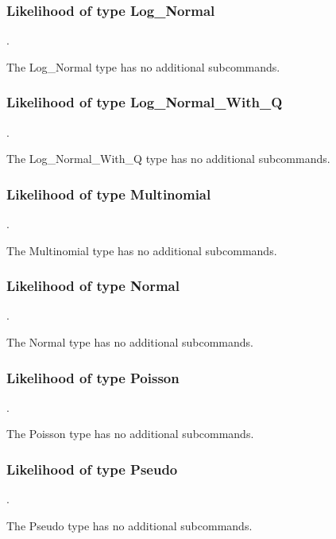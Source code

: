 \subsubsection{Likelihood of type Log\_Normal}
.
\label{syntax:Likelihood-LogNormal}

The Log\_Normal type has no additional subcommands.
\subsubsection{Likelihood of type Log\_Normal\_With\_Q}
.
\label{syntax:Likelihood-LogNormalWithQ}

The Log\_Normal\_With\_Q type has no additional subcommands.
\subsubsection{Likelihood of type Multinomial}
.
\label{syntax:Likelihood-Multinomial}

The Multinomial type has no additional subcommands.
\subsubsection{Likelihood of type Normal}
.
\label{syntax:Likelihood-Normal}

The Normal type has no additional subcommands.
\subsubsection{Likelihood of type Poisson}
.
\label{syntax:Likelihood-Poisson}

The Poisson type has no additional subcommands.
\subsubsection{Likelihood of type Pseudo}
.
\label{syntax:Likelihood-Pseudo}

The Pseudo type has no additional subcommands.
